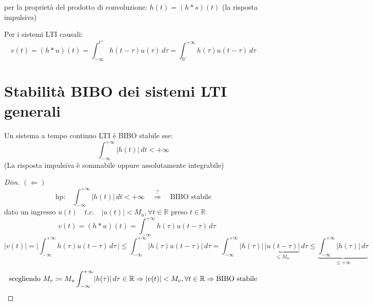 \begin{osservazione}
	per la proprietà del prodotto di convoluzione: $h(t)=(h*s)(t)$ (la risposta impulsiva) %
\end{osservazione}

Per i sistemi LTI causali:
\[
	v(t)=(h*u)(t) = \int_{-\infty}^{t^+}h(t-\tau)u(\tau)\,d\tau = \int_{0^-}^{+\infty}h(\tau)u(t-\tau)\,d\tau
\]


\section{Stabilità BIBO dei sistemi LTI generali}
\label{sec:BIBO}




Un sistema a tempo continuo LTI è BIBO stabile sse:
\[
	\int_{-\infty}^{+\infty}\lvert h(t) \rvert \,dt < +\infty
\]
(La risposta impulsiva è sommabile oppure assolutamente integrabile)

\begin{proof}[Dim]
	\emph{$(\Leftarrow)$}
	\[
		\text{hp:} \quad \int_{-\infty}^{+\infty}\lvert h(t) \rvert \,dt < +\infty \quad \overset{?}{\Rightarrow} \quad \text{BIBO stabile}
	\]	
	dato un ingresso $u(t) \quad t.c.\quad \lvert u(t) \rvert < M_u , \forall t \in \mathbb{R}$ preso $t \in \mathbb{R}$ 
	\[
		\quad v(t)=(h*u)(t) = \int_{-\infty}^{+\infty}h(\tau)u(t-\tau)\,d\tau 
	\]
	\[
		\lvert v(t) \rvert 
		= \bigg\lvert \int_{-\infty}^{+\infty}h(\tau)u(t-\tau)\,d\tau \,  \bigg\rvert
		\le \int_{-\infty}^{+\infty} \rvert h(\tau)u(t-\tau) \lvert\,d\tau
		= \int_{-\infty}^{+\infty} \rvert h(\tau) \lvert \, \underbrace{\rvert u(t-\tau) \lvert}_{\le M_u} \,d\tau
		\le \underbrace{\int_{-\infty}^{+\infty} \rvert h(\tau)\lvert\,d\tau}_{\le + \infty}
	\]
	\[
		\text{scegliendo } M_v \coloneqq M_u \int_{-\infty}^{+\infty} \rvert h(\tau)\lvert\,d\tau \in \mathbb{R} \Rightarrow \lvert v(t) \rvert < M_v, \forall t \in \mathbb{R}\Rightarrow \text{BIBO stabile} \qedhere
	\]
\end{proof}

